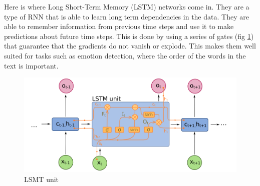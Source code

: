 Here is where Long Short-Term Memory (LSTM) networks come in. They are a type
of
RNN that is able to learn long term dependencies in the data. They are able to
remember information from previous time steps and use it to make predictions
about future time steps. This is done by using a series of gates (fig
\ref{fig:lstm_unit}) that guarantee that the gradients do not vanish or
explode. This makes them well suited for tasks such as emotion detection, where
the order of the words in the text is important.

\begin{figure}[!ht]
    \includegraphics[keepaspectratio,
        width=15cm]{./figures/1024px-Long_Short-Term_Memory.png}
    \caption{LSMT unit \cite{LSTM}}
    \label{fig:lstm_unit}

\end{figure}